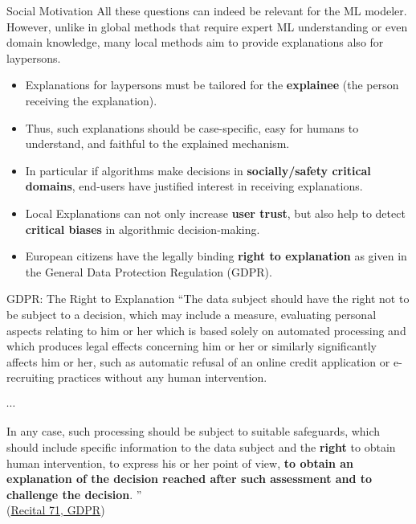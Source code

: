 \documentclass[11pt,compress,t,notes=noshow, xcolor=table]{beamer}
\begin{document}
\begin{vbframe}{Social Motivation}
All these questions can indeed be relevant for the ML modeler. However, unlike in global methods that require expert ML understanding or even domain knowledge, many local methods aim to provide explanations also for laypersons. 
	\begin{itemize}
		\item Explanations for laypersons must be tailored for the \textbf{explainee} (the person receiving the explanation).
		\item Thus, such explanations should be case-specific, easy for humans to understand, and faithful to the explained mechanism.
		\item In particular if algorithms make decisions in \textbf{socially/safety critical domains}, end-users have justified interest in receiving explanations.
		\item Local Explanations can not only increase \textbf{user trust}, but also help to detect \textbf{critical biases} in algorithmic decision-making.
		\item European citizens have the legally binding \textbf{right to explanation} as given in the General Data Protection Regulation (GDPR).

	\end{itemize}
\end{vbframe}


\begin{vbframe}{GDPR: The Right to Explanation}
    ``The data subject should have the right not to be subject to a decision, which may include a measure, evaluating personal aspects relating to him or her which is based solely on automated processing and which produces legal effects concerning him or her or similarly significantly affects him or her, such as automatic refusal of an online credit application or e-recruiting practices without any human intervention.

$\cdots$

In any case, such processing should be subject to suitable safeguards, which should include specific information to the data subject and the \textbf{right} to obtain human intervention, to express his or her point of view, \textbf{to obtain an explanation of the decision reached after such assessment and to challenge the decision}.
'' \\[0.2cm] (\href{https://gdpr-text.com/read/recital-71/}{Recital 71, GDPR})
\end{vbframe}
\end{document}
